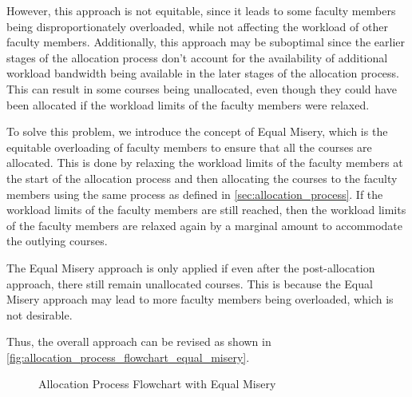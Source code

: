 However, this approach is not equitable, since it leads to some faculty members being disproportionately overloaded, while not affecting the workload of other faculty members. Additionally, this approach may be suboptimal since the earlier stages of the allocation process don't account for the availability of additional workload bandwidth being available in the later stages of the allocation process. This can result in some courses being unallocated, even though they could have been allocated if the workload limits of the faculty members were relaxed.

To solve this problem, we introduce the concept of Equal Misery, which is the equitable overloading of faculty members to ensure that all the courses are allocated. This is done by relaxing the workload limits of the faculty members at the start of the allocation process and then allocating the courses to the faculty members using the same process as defined in \autoref{sec:allocation_process}. If the workload limits of the faculty members are still reached, then the workload limits of the faculty members are relaxed again by a marginal amount to accommodate the outlying courses.

The Equal Misery approach is only applied if even after the post-allocation approach, there still remain unallocated courses. This is because the Equal Misery approach may lead to more faculty members being overloaded, which is not desirable.

Thus, the overall approach can be revised as shown in \autoref{fig:allocation_process_flowchart_equal_misery}.

\begin{figure}[H]
  \centering
  \caption{Allocation Process Flowchart with Equal Misery}
  \label{fig:allocation_process_flowchart_equal_misery}
\end{figure}

